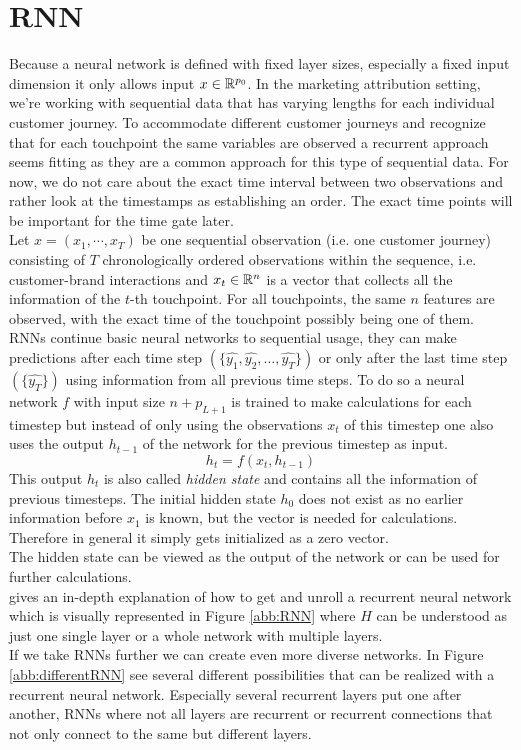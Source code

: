\section{RNN}
Because a neural network is defined with fixed layer sizes, especially a fixed input dimension it only allows input $x\in\mathbb{R}^{p_0}$.
In the marketing attribution setting, we're working with sequential data that has varying lengths for each individual customer journey. To accommodate different customer journeys and recognize that for each touchpoint the same variables are observed a recurrent approach seems fitting as they are a common approach for this type of sequential data. 
For now, we do not care about the exact time interval between two observations and rather look at the timestamps as establishing an order. The exact time points will be important for the time gate later.\\
Let $x=(x_1,\cdots,x_T)$ be one sequential observation (i.e. one customer journey) consisting of $T$ chronologically ordered observations within the sequence, i.e. customer-brand interactions and $x_t\in \mathbb{R}^{n}$ is a vector that collects all the information of the $t$-th touchpoint. For all touchpoints, the same $n$ features are observed, with the exact time of the touchpoint possibly being one of them.\\

RNNs continue basic neural networks to sequential usage, they can make predictions after each time step $(\{\hat{y_1},\hat{y_2}, \dots, \hat{y_T}\})$ or only after the last time step $(\{\hat{y_T}\})$ using information from all previous time steps. 
To do so a neural network $f$ with input size $n+p_{L+1}$ is trained to make calculations for each timestep but instead of only using the observations $x_t$ of this timestep one also uses the output $h_{t-1}$ of the network for the previous timestep as input. $$h_t=f(x_t,h_{t-1})$$
This output $h_{t}$ is also called \textit{hidden state} and contains all the information of  previous timesteps. The initial hidden state $h_0$ does not exist as no earlier information before $x_1$ is known, but the vector is needed for calculations. Therefore in general it simply gets initialized as a zero vector.\\
The hidden state can be viewed as the output of the network or can be used for further calculations.\\
\cite{sherstinsky-2020} gives an in-depth explanation of how to get and unroll a recurrent neural network which is visually represented in Figure \ref{abb:RNN} where $H$ can be understood as just one single layer or a whole network with multiple layers.\\
If we take RNNs further we can create even more diverse networks.
In Figure \ref{abb:differentRNN} see several different possibilities that can be realized with a recurrent neural network. Especially several recurrent layers put one after another, RNNs where not all layers are recurrent or recurrent connections that not only connect to the same but different layers.\\


